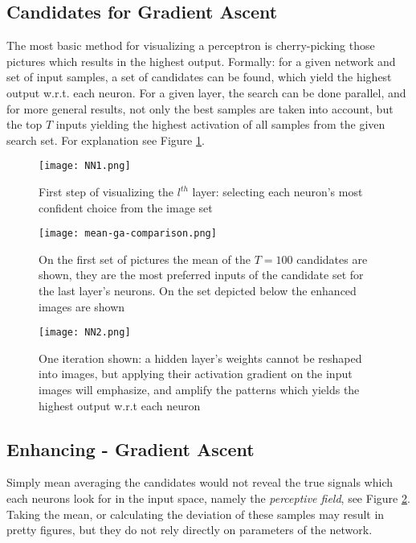 \subsection{Candidates for Gradient Ascent}
\label{method}
The most basic method for visualizing a perceptron is cherry-picking those pictures which results in the highest output.
Formally: for a given network and set of input samples, a set of candidates can be found, which yield the highest output w.r.t. each neuron. 
For a given layer, the search can be done parallel, and for more general results, not only the best samples are taken into account, but the top $T$ inputs yielding the highest activation of all samples from the given search set. For explanation see Figure \ref{fig:ga-method1}. 
\begin{figure}
    \centering
    \texttt{[image: NN1.png]}
    \caption{First step of visualizing the $l^{th}$ layer: selecting each neuron's most confident choice from the image set}
    \label{fig:ga-method1}
\end{figure}
\begin{figure}
    \centering
    \texttt{[image: mean-ga-comparison.png]}
    \caption{On the first set of pictures the mean of the $T=100$ candidates are shown, they are the most preferred inputs of the candidate set for the last layer's neurons. On the set depicted below the enhanced images are shown}
    \label{fig:mean-ga-comp}
\end{figure}
\begin{figure}
    \centering
    \texttt{[image: NN2.png]}
    \caption{One iteration shown: a hidden layer's weights cannot be reshaped into images, but applying their activation gradient on the input images will emphasize, and amplify the patterns which yields the highest output w.r.t each neuron}
    \label{fig:ga-method2}
\end{figure}

\subsection{Enhancing - Gradient Ascent}

Simply mean averaging the candidates would not reveal the true signals which each neurons look for in the input space, namely the \emph{perceptive field}, see Figure \ref{fig:mean-ga-comp}.
Taking the mean, or calculating the deviation of these samples may result in pretty figures, but they do not rely directly on parameters of the network.


